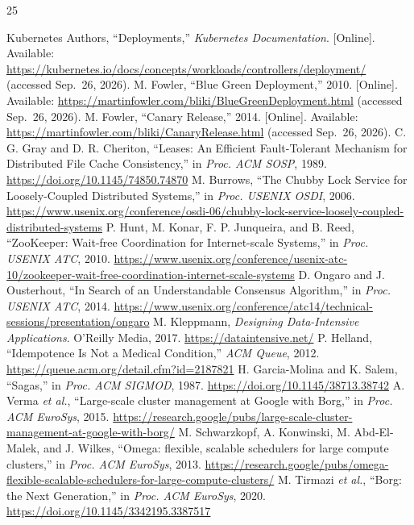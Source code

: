 \begin{thebibliography}{25}
\raggedright
\setlength{\itemsep}{-1pt}
 Kubernetes Authors, ``Deployments,'' \emph{Kubernetes Documentation}.
{[}Online{]}. Available:
\url{https://kubernetes.io/docs/concepts/workloads/controllers/deployment/}
(accessed Sep.~26, 2026).
 M. Fowler, ``Blue Green Deployment,'' 2010. {[}Online{]}. Available:
\url{https://martinfowler.com/bliki/BlueGreenDeployment.html} (accessed
Sep.~26, 2026).
 M. Fowler, ``Canary Release,'' 2014. {[}Online{]}. Available:
\url{https://martinfowler.com/bliki/CanaryRelease.html} (accessed Sep.~26,
2026).
 C. G. Gray and D. R. Cheriton, ``Leases: An Efficient Fault-Tolerant
Mechanism for Distributed File Cache Consistency,'' in \emph{Proc. ACM
SOSP}, 1989. \url{https://doi.org/10.1145/74850.74870}
 M. Burrows, ``The Chubby Lock Service for Loosely-Coupled Distributed
Systems,'' in \emph{Proc. USENIX OSDI}, 2006.
\url{https://www.usenix.org/conference/osdi-06/chubby-lock-service-loosely-coupled-distributed-systems}
 P. Hunt, M. Konar, F. P. Junqueira, and B. Reed, ``ZooKeeper: Wait-free
Coordination for Internet-scale Systems,'' in \emph{Proc. USENIX ATC},
2010.
\url{https://www.usenix.org/conference/usenix-atc-10/zookeeper-wait-free-coordination-internet-scale-systems}
 D. Ongaro and J. Ousterhout, ``In Search of an Understandable Consensus
Algorithm,'' in \emph{Proc. USENIX ATC}, 2014.
\url{https://www.usenix.org/conference/atc14/technical-sessions/presentation/ongaro}
 M. Kleppmann, \emph{Designing Data-Intensive Applications}. O'Reilly
Media, 2017. \url{https://dataintensive.net/}
 P. Helland, ``Idempotence Is Not a Medical Condition,'' \emph{ACM
Queue}, 2012. \url{https://queue.acm.org/detail.cfm?id=2187821}
 H. Garcia-Molina and K. Salem, ``Sagas,'' in \emph{Proc. ACM SIGMOD},
1987. \url{https://doi.org/10.1145/38713.38742}
 A. Verma \emph{et al.}, ``Large-scale cluster management at Google with
Borg,'' in \emph{Proc. ACM EuroSys}, 2015.
\url{https://research.google/pubs/large-scale-cluster-management-at-google-with-borg/}
 M. Schwarzkopf, A. Konwinski, M. Abd-El-Malek, and J. Wilkes, ``Omega:
flexible, scalable schedulers for large compute clusters,'' in
\emph{Proc. ACM EuroSys}, 2013.
\url{https://research.google/pubs/omega-flexible-scalable-schedulers-for-large-compute-clusters/}
 M. Tirmazi \emph{et al.}, ``Borg: the Next Generation,'' in \emph{Proc.
ACM EuroSys}, 2020.
\url{https://doi.org/10.1145/3342195.3387517}

\end{thebibliography}
